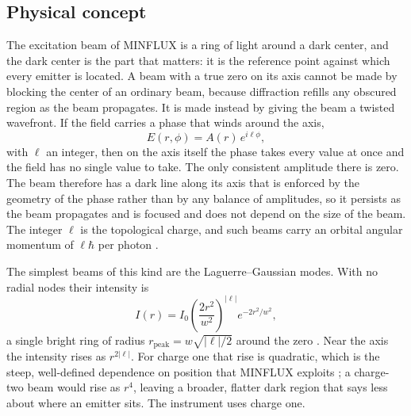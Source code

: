 \documentclass{article}
\begin{document}
\subsection{Physical concept}

The excitation beam of MINFLUX is a ring of light around a dark center, and the dark center is the
part that matters: it is the reference point against which every emitter is located. A beam with a
true zero on its axis cannot be made by blocking the center of an ordinary beam, because
diffraction refills any obscured region as the beam propagates. It is made instead by giving the
beam a twisted wavefront. If the field carries a phase that winds around the axis,
\begin{equation}
    E(r,\phi) = A(r)\,e^{i\ell\phi},
\end{equation}
with $\ell$ an integer, then on the axis itself the phase takes every value at once and the field
has no single value to take. The only consistent amplitude there is zero. The beam therefore has a
dark line along its axis that is enforced by the geometry of the phase rather than by any balance
of amplitudes, so it persists as the beam propagates and is focused and does not depend on the
size of the beam. The integer $\ell$ is the topological charge, and such beams carry an orbital
angular momentum of $\ell\hbar$ per photon \cite{allenOrbitalAngularMomentum1992}.

The simplest beams of this kind are the Laguerre--Gaussian modes. With no radial nodes their
intensity is
\begin{equation}
    I(r) = I_0 \left(\frac{2r^2}{w^2}\right)^{|\ell|} e^{-2r^2/w^2},
    \label{eq:lg-intensity}
\end{equation}
a single bright ring of radius $r_\mathrm{peak} = w\sqrt{|\ell|/2}$ around the zero
\cite{allenOrbitalAngularMomentum1992}. Near the axis the intensity rises as $r^{2|\ell|}$. For
charge one that rise is quadratic, which is the steep, well-defined dependence on position that
MINFLUX exploits \cite{balzarottiNanometerResolutionImaging2017}; a charge-two beam would rise as
$r^4$, leaving a broader, flatter dark region that says less about where an emitter sits. The
instrument uses charge one.
\end{document}
